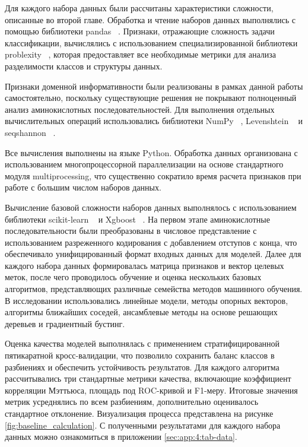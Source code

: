 \documentclass[specification,annotation,times]{itmo-student-thesis}
\begin{document}
Для каждого набора данных были рассчитаны характеристики сложности, описанные во второй главе. 
Обработка и чтение наборов данных выполнялись с помощью библиотеки pandas ~\cite{mckinney2011pandas}.
Признаки, отражающие сложность задачи классификации, вычислялись с использованием специализированной библиотеки problexity ~\cite{komorniczak2023problexity}, которая предоставляет все необходимые метрики для анализа разделимости классов и структуры данных. 

Признаки доменной информативности были реализованы в рамках данной работы самостоятельно, поскольку существующие решения не покрывают полноценный анализ аминокислотных последовательностей. Для выполнения отдельных вычислительных операций использовались библиотеки NumPy ~\cite{harris2020array}, Levenshtein ~\cite{levenshtein} и seqshannon ~\cite{seqshannon}.

Все вычисления выполнены на языке Python. Обработка данных организована с использованием многопроцессорной параллелизации на основе стандартного модуля multiprocessing, что существенно сократило время расчета признаков при работе с большим числом наборов данных.

Вычисление базовой сложности наборов данных выполнялось с использованием библиотеки scikit-learn ~\cite{scikit-learn} и Xgboost ~\cite{chen2016xgboost}. На первом этапе аминокислотные последовательности были преобразованы в числовое представление с использованием разреженного кодирования с добавлением отступов с конца, что обеспечивало унифицированный формат входных данных для моделей. Далее для каждого набора данных формировалась матрица признаков и вектор целевых меток, после чего проводилось обучение и оценка нескольких базовых алгоритмов, представляющих различные семейства методов машинного обучения. В исследовании использовались линейные модели, методы опорных векторов, алгоритмы ближайших соседей, ансамблевые методы на основе решающих деревьев и градиентный бустинг.

Оценка качества моделей выполнялась с применением стратифицированной пятикаратной кросс-валидации, что позволило сохранить баланс классов в разбиениях и обеспечить устойчивость результатов. Для каждого алгоритма рассчитывались три стандартные метрики качества, включающие коэффициент корреляции Мэттьюса, площадь под ROC-кривой и F1-меру. Итоговые значения метрик усреднялись по всем разбиениям, дополнительно оценивалось стандартное отклонение. 
Визуализация процесса представлена на рисунке \ref{fig:baseline_calculation}.
С полученными результатами для каждого набора данных можно ознакомиться в приложении \ref{sec:app:4:tab-data}. 
\end{document}
